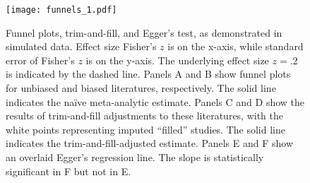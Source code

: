 \documentclass[man]{apa6}
\begin{document}



\newpage



\begin{figure}
	\texttt{[image: funnels\_1.pdf]}
	\caption{Funnel plots, trim-and-fill, and Egger's test, as demonstrated in simulated data. Effect size Fisher's $z$ is on the x-axis, while standard error of Fisher's $z$ is on the y-axis. The underlying effect size $z = .2$ is indicated by the dashed line. Panels A and B show funnel plots for unbiased and biased literatures, respectively. The solid line indicates the na{\"i}ve meta-analytic estimate. Panels C and D show the results of trim-and-fill adjustments to these literatures, with the white points representing imputed ``filled'' studies. The solid line indicates the trim-and-fill-adjusted estimate. Panels E and F show an overlaid Egger's regression line. The slope is statistically significant in F but not in E.}
	\label{funnels1}
\end{figure}
\end{document}
